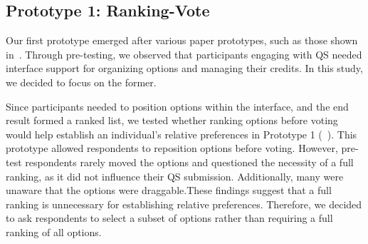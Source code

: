 \subsection{Prototype 1: Ranking-Vote}
Our first prototype emerged after various paper prototypes, such as those shown in~. Through pre-testing, we observed that participants engaging with QS needed interface support for organizing options and managing their credits. In this study, we decided to focus on the former.

Since participants needed to position options within the interface, and the end result formed a ranked list, we tested whether ranking options before voting would help establish an individual's relative preferences in Prototype 1 (~). This prototype allowed respondents to reposition options before voting. However, pre-test respondents rarely moved the options and questioned the necessity of a full ranking, as it did not influence their QS submission. Additionally, many were unaware that the options were draggable.These findings suggest that a full ranking is unnecessary for establishing relative preferences. Therefore, we decided to ask respondents to select a subset of options rather than requiring a full ranking of all options.

